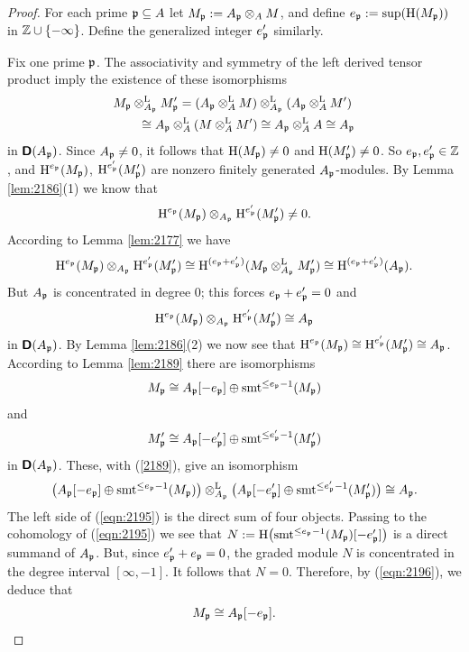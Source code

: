 \begin{proof}
For each prime $\mathfrak{p} \subseteq A$ let $M_{\mathfrak{p}} := A_{\mathfrak{p}} \otimes_A M$, and define 
$e_{\mathfrak{p}} := \operatorname{sup}(\operatorname{H}(M_{\mathfrak{p}}))$ in $\mathbb{Z} \cup \{ -\infty \}$.
Define the generalized integer $e'_{\mathfrak{p}}$ similarly. 

Fix one prime $\mathfrak{p}$. 
The associativity and symmetry of the left derived tensor product imply the 
existence of these isomorphisms
\begin{equation} \label{2189}
\begin{aligned}
& M_{\mathfrak{p}} \otimes^{\mathrm{L}}_{A_{\mathfrak{p}}} M'_{\mathfrak{p}} = 
(A_{\mathfrak{p}} \otimes^{\mathrm{L}}_{A} M) \otimes^{\mathrm{L}}_{A_{\mathfrak{p}}}
(A_{\mathfrak{p}} \otimes^{\mathrm{L}}_{A} M')
\\
& \qquad 
\cong A_{\mathfrak{p}} \otimes^{\mathrm{L}}_{A} (M \otimes^{\mathrm{L}}_A M') 
\cong A_{\mathfrak{p}} \otimes^{\mathrm{L}}_{A} A \cong A_{\mathfrak{p}} 
\end{aligned}
\end{equation}
in $\boldsymbol{\mathsf{D}}(A_{\mathfrak{p}})$. Since $A_{\mathfrak{p}} \neq 0$, it follows that
$\operatorname{H}(M_{\mathfrak{p}}) \neq 0$ and $\operatorname{H}(M'_{\mathfrak{p}}) \neq 0$.
So $e_{\mathfrak{p}}, e'_{\mathfrak{p}} \in \mathbb{Z}$, and 
$\operatorname{H}^{e_{\mathfrak{p}}}(M_{\mathfrak{p}})$, $\operatorname{H}^{e'_{\mathfrak{p}}}(M'_{\mathfrak{p}})$ are nonzero finitely 
generated $A_{\mathfrak{p}}$-modules. By Lemma \ref{lem:2186}(1) we know that 
\[ \operatorname{H}^{e_{\mathfrak{p}}}(M_{\mathfrak{p}}) \otimes_{A_{\mathfrak{p}}} \operatorname{H}^{e'_{\mathfrak{p}}}(M'_{\mathfrak{p}}) \neq 0 . \]
According to Lemma \ref{lem:2177} we have 
\[ \operatorname{H}^{e_{\mathfrak{p}}}(M_{\mathfrak{p}}) \otimes_{A_{\mathfrak{p}}} \operatorname{H}^{e'_{\mathfrak{p}}}(M'_{\mathfrak{p}}) \cong 
\operatorname{H}^{(e_{\mathfrak{p}} + e'_{\mathfrak{p}})}(M_{\mathfrak{p}} \otimes^{\mathrm{L}}_{A_{\mathfrak{p}}} M'_{\mathfrak{p}}) \cong 
\operatorname{H}^{(e_{\mathfrak{p}} + e'_{\mathfrak{p}})}(A_{\mathfrak{p}}) . \]
But $A_{\mathfrak{p}}$ is concentrated in degree $0$; this forces 
$e_{\mathfrak{p}} + e'_{\mathfrak{p}} = 0$ and 
\[ \operatorname{H}^{e_{\mathfrak{p}}}(M_{\mathfrak{p}}) \otimes_{A_{\mathfrak{p}}} \operatorname{H}^{e'_{\mathfrak{p}}}(M'_{\mathfrak{p}}) \cong 
A_{\mathfrak{p}} \]
in $\boldsymbol{\mathsf{D}}(A_{\mathfrak{p}})$. 
By Lemma \ref{lem:2186}(2) we now see that
$\operatorname{H}^{e_{\mathfrak{p}}}(M_{\mathfrak{p}}) \cong \operatorname{H}^{e'_{\mathfrak{p}}}(M'_{\mathfrak{p}}) \cong A_{\mathfrak{p}}$. 
According to Lemma \ref{lem:2189} there are isomorphisms 
\begin{equation} \label{eqn:2196}
M_{\mathfrak{p}} \cong A_{\mathfrak{p}}[-e_{\mathfrak{p}}] \oplus \operatorname{smt}^{\leq e_{\mathfrak{p}} - 1}(M_{\mathfrak{p}}) 
\end{equation}
and 
\[ M'_{\mathfrak{p}} \cong A_{\mathfrak{p}}[-e'_{\mathfrak{p}}] \oplus \operatorname{smt}^{\leq e'_{\mathfrak{p}} - 1}(M'_{\mathfrak{p}})  
\]
in $\boldsymbol{\mathsf{D}}(A_{\mathfrak{p}})$. 
These, with (\ref{2189}), give an isomorphism
\begin{equation} \label{eqn:2195}
\bigl( A_{\mathfrak{p}}[-e_{\mathfrak{p}}] \oplus \operatorname{smt}^{\leq e_{\mathfrak{p}} - 1}(M_{\mathfrak{p}}) \bigr) 
\otimes^{\mathrm{L}}_{A_{\mathfrak{p}}}
\bigl( A_{\mathfrak{p}}[-e'_{\mathfrak{p}}] \oplus \operatorname{smt}^{\leq e'_{\mathfrak{p}} - 1}(M'_{\mathfrak{p}}) \bigr)
\cong A_{\mathfrak{p}} .
\end{equation}
The left side of (\ref{eqn:2195}) is the direct sum of four objects. 
Passing to the cohomology of (\ref{eqn:2195}) we see that 
$N := \operatorname{H} \bigl( \operatorname{smt}^{\leq e_{\mathfrak{p}} - 1}(M_{\mathfrak{p}})[-e'_{\mathfrak{p}}] \bigr)$ 
is a direct summand of $A_{\mathfrak{p}}$.
But, since $e'_{\mathfrak{p}} + e_{\mathfrak{p}} = 0$, the graded module $N$ is concentrated in the 
degree interval $[\infty,  -1]$. It follows that $N = 0$. Therefore, by 
(\ref{eqn:2196}), we deduce that 
\begin{equation} \label{eqn:2197}
M_{\mathfrak{p}} \cong A_{\mathfrak{p}}[-e_{\mathfrak{p}}] . 
\end{equation}


\end{proof}
